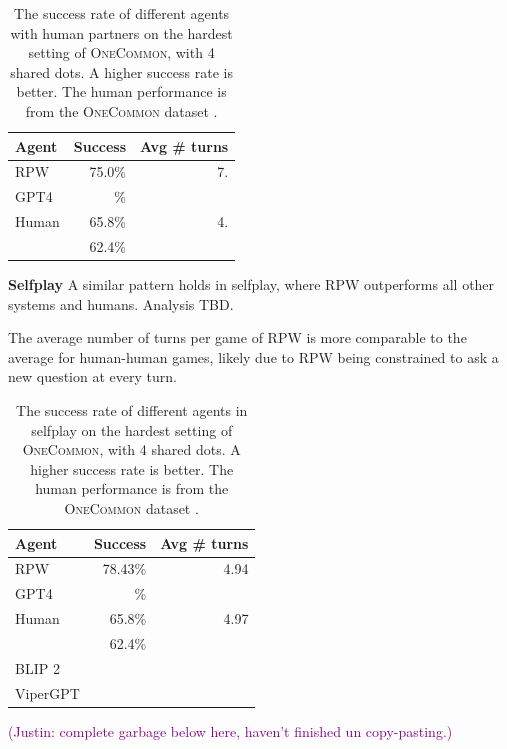 \documentclass[11pt]{article}
\newcommand{\system}{RPW}
\newcommand{\justin}[1]{{{\textcolor{purple}{(Justin: #1)}}}}
\begin{document}
\begin{table}[!t]
\centering
\begin{tabular}{lrr}
\toprule
Agent                   & Success & Avg \# turns\\
\midrule
\system{}               & 75.0\%        & 7.\\
GPT4                    & \%  & \\
Human                   & 65.8\%  & 4.\\
\citet{fried}           & 62.4\%  & \\
\bottomrule
\end{tabular}
\caption{\label{tbl:human-eval}
The success rate of different agents with human partners on the hardest setting of \textsc{OneCommon}, with 4 shared dots.
A higher success rate is better.
The human performance is from the \textsc{OneCommon} dataset
\citep{onecommon}.
}
\end{table}

\textbf{Selfplay}
A similar pattern holds in selfplay,
where \system{} outperforms all other systems and humans.
Analysis TBD.

The average number of turns per game of \system{} is more comparable 
to the average for human-human games, likely due to \system{}
being constrained to ask a new question at every turn.

\begin{table}[!t]
\centering
\begin{tabular}{lrr}
\toprule
Agent                   & Success & Avg \# turns\\
\midrule
\system{}               & 78.43\% & 4.94\\
GPT4                    & \%      & \\
Human                   & 65.8\%  & 4.97\\
\citet{fried}           & 62.4\%  & \\
BLIP 2                  &         & \\
ViperGPT                &         & \\
\bottomrule
\end{tabular}
\caption{\label{tbl:selfplay}
The success rate of different agents in selfplay on the hardest setting of \textsc{OneCommon}, with 4 shared dots.
A higher success rate is better.
The human performance is from the \textsc{OneCommon} dataset
\citep{onecommon}.
}
\end{table}

\justin{complete garbage below here, haven't finished un copy-pasting.}
\end{document}

